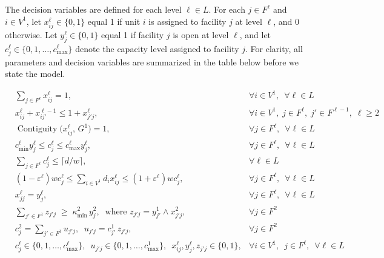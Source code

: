 \documentclass[preprint,12pt,authoryear]{elsarticle}
\theoremstyle{definition}
\DeclareMathOperator{\Contiguity}{Contiguity}  %
\begin{document}
The decision variables are defined for each level $\ell \in L$. For each
$j \in F^\ell$ and $i \in V^1$, let $x_{ij}^\ell \in \{0,1\}$ equal 1 if
unit $i$ is assigned to facility $j$ at level $\ell$, and 0 otherwise. Let
$y_j^\ell \in \{0,1\}$ equal 1 if facility $j$ is open at level $\ell$, and let
$c^{\ell}_j \in \{0, 1, \ldots, c^{\ell}_{\max}\}$ denote the capacity level 
assigned to facility $j$. For clarity, all parameters and decision variables 
are summarized in the table below before we state the model.
 

\setcounter{equation}{0}
\begin{align}
    &\sum\limits_{j \in F^\ell} x_{ij}^\ell=1,
    &\forall i \in V^1, \;\ \forall \ell \in L \label{cons:assignment} \\[6pt]
    & x_{ij}^{\ell} + x_{ij'}^{\ell-1} \leq 1 + x_{j'j}^{\ell},
    &\forall i \in V^1,\; j \in F^\ell,\; j' \in F^{\ell-1},\;
    \ell \ge 2 \label{cons:hierarchy} \\[6pt]
    & \Contiguity\!\bigl(x^{\ell}_{ij},\, G^1\bigr) = 1,
    &\forall j \in F^\ell, \;\ \forall \ell \in L  \label{cons:contiguity} \\[6pt]
    & c^{\ell}_{\min} y^{\ell}_j \leq c^{\ell}_j \leq c^{\ell}_{\max} y^{\ell}_j,
    &\forall j \in F^\ell, \;\ \forall \ell \in L \label{cons4} \\[6pt]
    & \sum\limits_{j \in F^\ell} c^{\ell}_j  \leq  \lceil d/w \rceil,
    &\forall \ell \in L \label{cons:coverage} \\[6pt]
    &(1-\varepsilon^\ell) w c^\ell_j \leq \sum\limits_{i \in V^1} d_i x_{ij}^\ell \leq (1+ \varepsilon^\ell) w c^\ell_j,
    &\forall j \in F^\ell, \;\ \forall \ell \in L \label{cons:balance} \\[6pt]
    &  x^{\ell}_{jj} = y^{\ell}_j,
    &\forall j \in F^\ell, \;\ \forall \ell \in L \label{cons:anchor} \\[6pt]
    & \sum_{j' \in F^1} z_{j'j} \;\geq\; \kappa^2_{\min}\,y^{2}_j,
       \;\;\text{where } z_{j'j} = y^1_{j'} \wedge x^{2}_{j'j},
    &\forall j \in F^2 \label{cons:minL1perL2} \\[6pt]
    & c^{2}_j = \sum\limits_{j' \in F^1} u_{j'j}, \;\; u_{j'j} = c^1_{j'}\, z_{j'j},
    &\forall j \in F^2 \label{cons:aggregate} \\[6pt]
    & c^\ell_j \in \{0, 1, \ldots, c^\ell_{\max}\}, \;\ u_{j'j} \in \{0, 1, \ldots, c^1_{\max}\}, \;\ x^\ell_{ij}, y^\ell_j, z_{j'j} \in \{0, 1\},
    &\forall i \in V^1, \;\ j \in F^\ell, \;\ \forall \ell \in L \label{cons:integrality} 
    \end{align}
\end{document}
